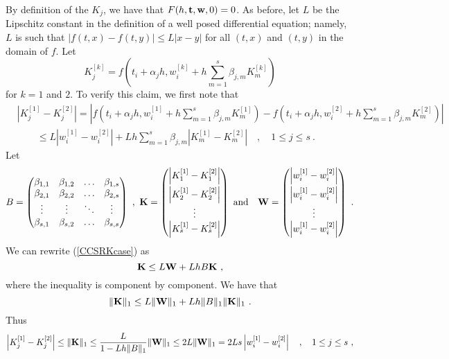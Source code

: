 \begin{enumerate}
By definition of the $K_j$, we have that $F(h,\mathbf{t},\mathbf{w},0) = 0$.
As before, let $L$ be the Lipschitz constant in the definition of a well
posed differential  equation; namely, $L$ is such that
$|f(t,x)-f(t,y)| \leq L |x-y|$ for all $(t,x)$ and $(t,y)$ in
the domain of $f$.  Let
\[
K_j^{[k]} = f(t_i + \alpha_j h,
w_i^{[k]} + h \sum_{m=1}^s \beta_{j,m} K_m^{[k]})
\]
for $k=1$ and $2$.  To verify this claim, we first note that
\begin{align}
&\left| K_j^{[1]}  - K_j^{[2]}  \right|
= \left|f(t_i + \alpha_j h,
w_i^{[1]} + h \sum_{m=1}^s \beta_{j,m} K_m^{[1]})
- f(t_i + \alpha_j h,
w_i^{[2]} + h \sum_{m=1}^s \beta_{j,m} K_m^{[2]}) \right| \nonumber \\
&\qquad \leq L \left| w_i^{[1]} - w_i^{[2]} \right|
 + L h \sum_{m=1}^s \beta_{j,m} \left| K_m^{[1]} - K_m^{[2]} \right|
\quad , \quad 1 \leq j \leq s \ . \label{CCSRKcase}
\end{align}
Let
\[
B = \begin{pmatrix} \beta_{1,1} & \beta_{1,2} & \ldots & \beta_{1,s} \\
\beta_{2,1} & \beta_{2,2} & \ldots & \beta_{2,s} \\
\vdots & \vdots & \ddots & \vdots \\
\beta_{s,1} & \beta_{s,2} & \ldots & \beta_{s,s}
\end{pmatrix} \ , \ 
\VEC{K} =
\begin{pmatrix}
\left| K_1^{[1]}  - K_1^{[2]}  \right| \\[0.5em]
\left| K_2^{[1]}  - K_2^{[2]}  \right| \\
\vdots \\
\left| K_s^{[1]}  - K_s^{[2]}  \right|
\end{pmatrix}
\ \text{and} \quad
\VEC{W} =
\begin{pmatrix}
\left| w_i^{[1]}  - w_i^{[2]}  \right| \\[0.5em]
\left| w_i^{[1]}  - w_i^{[2]}  \right| \\
\vdots \\
\left| w_i^{[1]}  - w_i^{[2]}  \right|
\end{pmatrix}
\ .
\]
We can rewrite (\ref{CCSRKcase}) as
\[
  \VEC{K} \leq L\VEC{W} + L h B \VEC{K} \ ,
\]
where the inequality is component by component.
We have that
\[
  \| \mathbf{K} \|_1 \leq L \|\mathbf{W}\|_1 + L h \|B\|_1 \|\mathbf{K}\|_1 \ .
\]
Thus
\[
\left| K_j^{[1]}  - K_j^{[2]}  \right| \leq
\|\mathbf{K}\|_1 \leq \frac{L}{1-L h\|B\|_1} \|\mathbf{W}\|_1
\leq 2 L \|\mathbf{W}\|_1
= 2 L s \left| w_i^{[1]} - w_i^{[2]} \right|
\quad , \quad 1 \leq j \leq s \ ,
\]
\end{enumerate}
